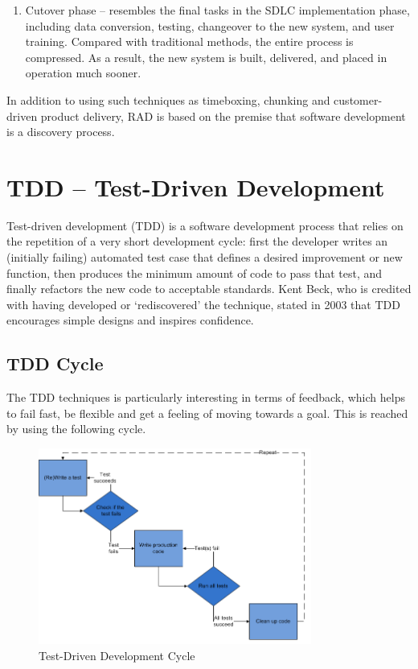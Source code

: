 \begin{enumerate}
\item Cutover phase -- resembles the final tasks in the SDLC implementation phase, including data conversion, testing, changeover to the new system, and user training. Compared with traditional methods, the entire process is compressed. As a result, the new system is built, delivered, and placed in operation much sooner.
\end{enumerate}

In addition to using such techniques as timeboxing, chunking and customer-driven product delivery, RAD is based on the premise that software development is a discovery process.


\section{TDD -- Test-Driven Development}

Test-driven development (TDD) is a software development process that relies on the repetition of a very short development cycle: first the developer writes an (initially failing) automated test case that defines a desired improvement or new function, then produces the minimum amount of code to pass that test, and finally refactors the new code to acceptable standards. Kent Beck, who is credited with having developed or `rediscovered' the technique, stated in 2003 that TDD encourages simple designs and inspires confidence.

\subsection{TDD Cycle}

The TDD techniques is particularly interesting in terms of feedback, which helps to fail fast, be flexible and get a feeling of moving towards a goal. This is reached by using the following cycle.

\begin{figure}
	\centering
	\includegraphics[width=0.8\textwidth]{resources/Test-driven_development.png}
	\caption[Test-Driven Development Cycle]{Test-Driven Development Cycle}
\end{figure}

